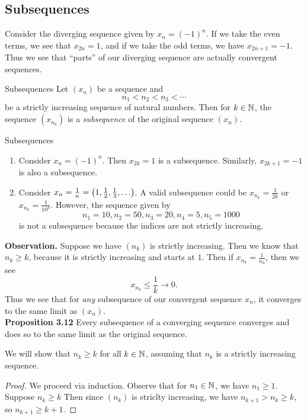 \documentclass[class=article, crop=false]{standalone}
\begin{document}
  \subsection{Subsequences}
  Consider the diverging sequence given by $x_n = (-1)^n$. If we take the even terms, we see that $x_{2n} = 1$, and if we take the odd terms, we have $x_{2n + 1} = -1$. Thus we see that ``parts'' of our diverging sequence are actually convergent sequences.
  \begin{definition}{Subsequences}
    Let $(x_n)$ be a sequence and
    \[
      n_1 < n_2 < n_3 < \dotsb
    \]
    be a strictly increasing sequence of natural numbers. Then for $k\in\mathbb{N}$, the sequence $(x_{n_k})$ is a \emph{subsequence} of the original sequence $(x_n)$.
  \end{definition}
  \begin{example}{Subsequences}
    \begin{enumerate}
      \item Consider $x_n = (-1)^n$. Then $x_{2k} = 1$ is a subsequence. Similarly, $x_{2k + 1} = -1$ is also a subsequence.
      \item Consider $x_n = \frac{1}{n} = \paren{1, \frac{1}{2}, \frac{1}{3}, \dotsc}$. A valid subsequence could be $x_{n_k} = \frac{1}{2k}$ or $x_{n_k} = \frac{1}{10^k}$. However, the sequence given by
      \[
        n_1 = 10, n_2 = 50, n_3 = 20, n_4 = 5, n_5 = 1000
      \]
      is not a subsequence because the indices are not strictly increasing.
    \end{enumerate}
  \end{example}
  \textbf{Observation.} Suppose we have $(n_k)$ is strictly increasing. Then we know that $n_k\geq k$, because it is strictly increasing and starts at $1$. Then if $x_{n_k} = \frac{1}{n_k}$, then we see
  \[
    x_{n_k}\leq \frac{1}{k}\to 0.
  \]
  Thus we see that for \emph{any} subsequence of our convergent sequence $x_n$, it converges to the same limit as $(x_n)$. \\[10pt]
  \textbf{Proposition 3.12} Every subsequence of a converging sequence converges and does so to the same limit as the original sequence.
  \begin{lemma}{}
    We will show that $n_k\geq k$ for all $k\in\mathbb{N}$, assuming that $n_k$ is a strictly increasing sequence.
    \begin{proof}
      We proceed via induction. Observe that for $n_1\in\mathbb{N}$, we have $n_1\geq 1$. Suppose $n_k\geq k$ Then since $(n_k)$ is striclty increasing, we have $n_{k + 1} > n_k\geq k$, so $n_{k + 1}\geq k + 1$.
    \end{proof}
  \end{lemma}
\end{document}
